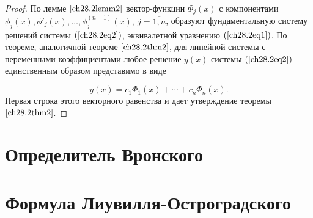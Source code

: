 \begin{proof}
По лемме $\ref{ch28.2lemm2}$ вектор-функции $\Phi_j(x)$ с компонентами $\phi_j(x), \phi'_j(x), \ldots, \phi^{(n - 1)}_j(x), \: j = \overline{1,n}$, образуют фундаментальную систему решений системы $(\ref{ch28.2eq2})$, эквивалетной уравнению $(\ref{ch28.2eq1})$. По теореме, аналогичной теореме $\ref{ch28.2thm2}$, для линейной системы с переменными коэффициентами любое решение $y(x)$ системы $(\ref{ch28.2eq2})$ единственным образом представимо в виде

$$
y(x) = c_1 \Phi_1(x) + \cdots + c_n \Phi_n(x).
$$
Первая строка этого векторного равенства и дает утверждение теоремы $\ref{ch28.2thm2}$.
\end{proof}
\section{Определитель Вронского}
\section{Формула Лиувилля-Остроградского}